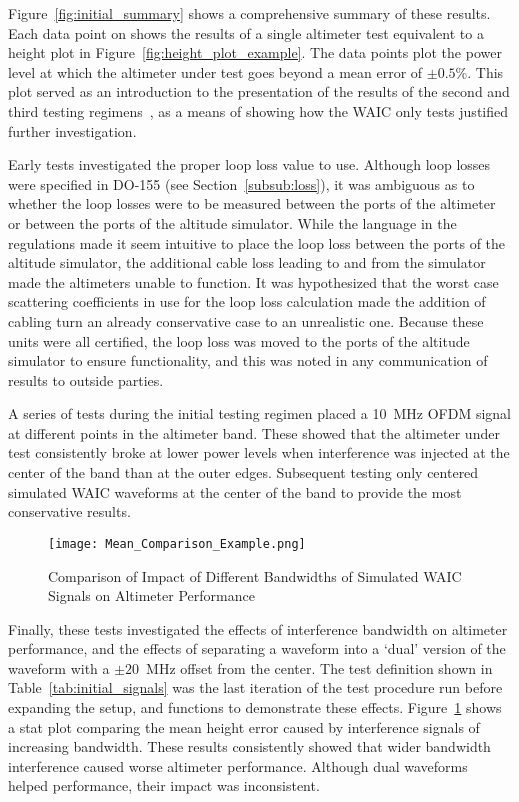 Figure~\ref{fig:initial_summary} shows a comprehensive summary of these results. Each data point on shows the results of a single altimeter test equivalent to a height plot in Figure~\ref{fig:height_plot_example}. The data points plot the power level at which the altimeter under test goes beyond a mean error of $\pm0.5\%$. This plot served as an introduction to the presentation of the results of the second and third testing regimens~\cite{uwe_radio_2019}, as a means of showing how the WAIC only tests justified further investigation. 

Early tests investigated the proper loop loss value to use. Although loop losses were specified in DO-155 (see Section~\ref{subsub:loss}), it was ambiguous as to whether the loop losses were to be measured between the ports of the altimeter or between the ports of the altitude simulator. While the language in the regulations made it seem intuitive to place the loop loss between the ports of the altitude simulator, the additional cable loss leading to and from the simulator made the altimeters unable to function. It was hypothesized that the worst case scattering coefficients in use for the loop loss calculation made the addition of cabling turn an already conservative case to an unrealistic one. Because these units were all certified, the loop loss was moved to the ports of the altitude simulator to ensure functionality, and this was noted in any communication of results to outside parties.

A series of tests during the initial testing regimen placed a 10~MHz OFDM signal at different points in the altimeter band. These showed that the altimeter under test consistently broke at lower power levels when interference was injected at the center of the band than at the outer edges. Subsequent testing only centered simulated WAIC waveforms at the center of the band to provide the most conservative results. 
\begin{figure}[h!]
	\centering
	\texttt{[image: Mean\_Comparison\_Example.png]}
	\caption{Comparison of Impact of Different Bandwidths of Simulated WAIC Signals on Altimeter Performance}
	\label{fig:mean_comparison}
\end{figure}
Finally, these tests investigated the effects of interference bandwidth on altimeter performance, and the effects of separating a waveform into a `dual' version of the waveform with a $\pm20$~MHz offset from the center. The test definition shown in Table~\ref{tab:initial_signals} was the last iteration of the test procedure run before expanding the setup, and functions to demonstrate these effects. Figure~\ref{fig:mean_comparison} shows a stat plot comparing the mean height error caused by interference signals of increasing bandwidth. These results consistently showed that wider bandwidth interference caused worse altimeter performance. Although dual waveforms helped performance, their impact was inconsistent.  

